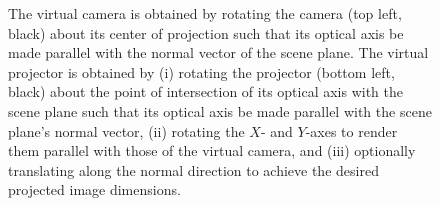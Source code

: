 \documentclass[review]{elsarticle}
\begin{document}
\begin{figure}
    \centering
    \qquad
    \caption{The virtual camera is obtained by rotating the camera (top left, black) about its center of projection such that its optical axis be made parallel with the normal vector of the scene plane. The virtual projector is obtained by (i) rotating the projector (bottom left, black) about the point of intersection of its optical axis with the scene plane such that its optical axis be made parallel with the scene plane's normal vector, (ii) rotating the $X$- and $Y$-axes to render them parallel with those of the virtual camera, and (iii) optionally translating along the normal direction to achieve the desired projected image dimensions.} %
    \label{fig:virtualproj}
\end{figure}
\end{document}
